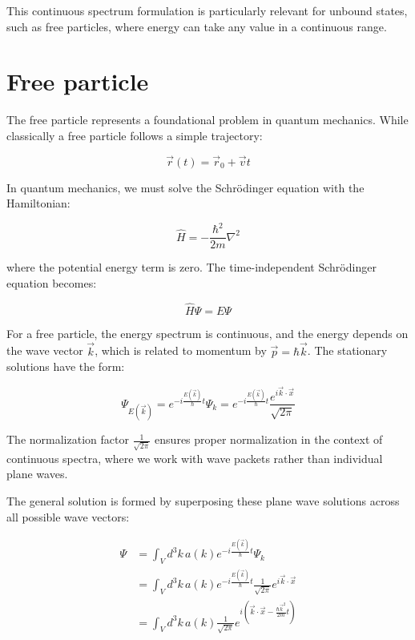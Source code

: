 \documentclass[italian]{HKNdocument}
\begin{document}
This continuous spectrum formulation is particularly relevant for unbound states, such as free particles, where energy can take any value in a continuous range.


\section{Free particle}

The free particle represents a foundational problem in quantum mechanics. While classically a free particle follows a simple trajectory:

\begin{equation}
\vec{r}(t) = \vec{r}_0 + \vec{v}t \label{eq:3.1}
\end{equation}

In quantum mechanics, we must solve the Schrödinger equation with the Hamiltonian:

\begin{equation}
\hat{H} = -\frac{\hbar^2}{2m}\nabla^2 \label{eq:3.2}
\end{equation}

where the potential energy term is zero. The time-independent Schrödinger equation becomes:

\begin{equation}
\hat{H}\Psi = E\Psi \label{eq:3.3}
\end{equation}

For a free particle, the energy spectrum is continuous, and the energy depends on the wave vector $\vec{k}$, which is related to momentum by $\vec{p} = \hbar\vec{k}$. The stationary solutions have the form:

\begin{equation}
\Psi_{E(\vec{k})} = e^{-i\frac{E(\vec{k})}{\hbar}t}\Psi_k = e^{-i\frac{E(\vec{k})}{\hbar}t}\frac{e^{i\vec{k}\cdot\vec{x}}}{\sqrt{2\pi}} \label{eq:3.4}
\end{equation}

The normalization factor $\frac{1}{\sqrt{2\pi}}$ ensures proper normalization in the context of continuous spectra, where we work with wave packets rather than individual plane waves.

The general solution is formed by superposing these plane wave solutions across all possible wave vectors:

\begin{align}
\Psi &= \int_V d^3k\,a(k)e^{-i\frac{E(\vec{k})}{\hbar}t}\Psi_k \\
&= \int_V d^3k\,a(k)e^{-i\frac{E(\vec{k})}{\hbar}t}\frac{1}{\sqrt{2\pi}}e^{i\vec{k}\cdot\vec{x}} \label{eq:3.5} \\
&= \int_V d^3k\,a(k)\frac{1}{\sqrt{2\pi}}e^{i\left(\vec{k}\cdot\vec{x} - \frac{\hbar\vec{k}^2}{2m}t\right)}
\end{align}
\end{document}
